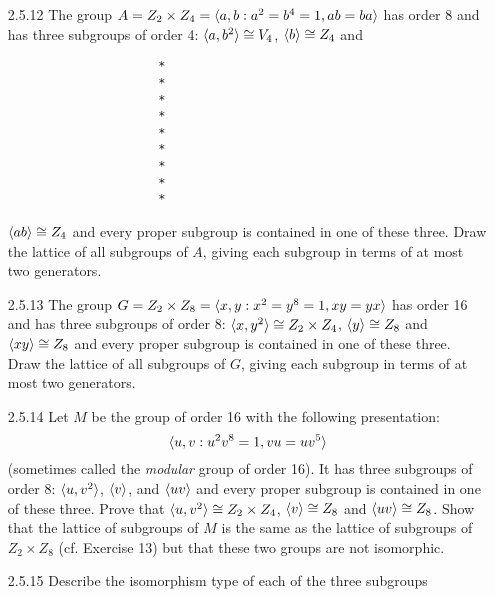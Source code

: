 \begin{enumerate}
   \item[2.5.12]  The group
                  $A = Z_2 \times Z_4 = \langle a, b : a^2 = b^4 = 1, ab = ba \rangle$ has
                  order 8 and has three subgroups of order 4:
                  $\langle a, b^2 \rangle \cong V_4$, $\langle b \rangle \cong Z_4$ and
                  \begin{verbatim}
                     *
                     *
                     *
                     *
                     *
                     *
                     *
                     *
                     *
                  \end{verbatim}
                  $\langle ab \rangle \cong Z_4$ and every proper subgroup is contained in
                  one of these three. Draw the lattice of all subgroups of $A$,
                  giving each subgroup in terms of at most two generators.
   \item[2.5.13]  The group
                  $G = Z_2 \times Z_8 = \langle x, y : x^2 = y^8 = 1, xy = yx \rangle$ has
                  order 16 and has three subgroups of order 8:
                  $\langle x, y^2 \rangle \cong Z_2 \times Z_4$, $\langle y \rangle \cong Z_8$ and
                  $\langle xy \rangle \cong Z_8$ and every proper subgroup is contained in
                  one of these three. Draw the lattice of all subgroups of $G$,
                  giving each subgroup in terms of at most two generators.
   \item[2.5.14]  Let $M$ be the group of order 16 with the following 
                  presentation:
                  $$\langle u, v : u^2 v^8 = 1, vu = uv^5 \rangle$$
                  (sometimes called the \textit{modular} group of order 16). It
                  has three subgroups of order 8: $\langle u, v^2 \rangle$, $\langle v \rangle$, and
                  $\langle uv \rangle$ and every proper subgroup is contained in one of
                  these three. Prove that $\langle u, v^2 \rangle \cong Z_2 \times Z_4$,
                  $\langle v \rangle \cong Z_8$ and $\langle uv \rangle \cong Z_8$. Show that the
                  lattice of subgroups of $M$ is the same as the lattice of
                  subgroups of $Z_2 \times Z_8$ (cf. Exercise 13) but that these
                  two groups are not isomorphic.
   \item[2.5.15]  Describe the isomorphism type of each of the three subgroups

\end{enumerate}
